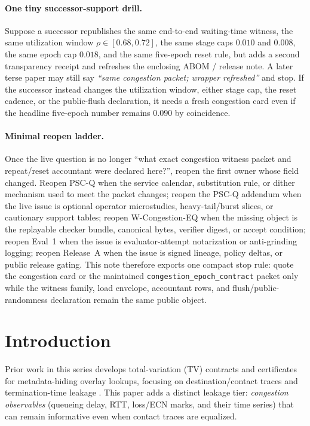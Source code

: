 \documentclass[11pt]{article}
\theoremstyle{definition}
\theoremstyle{remark}
\begin{document}
\paragraph{One tiny successor-support drill.}
Suppose a successor republishes the same end-to-end waiting-time witness, the same utilization window $\rho\in[0.68,0.72]$, the same stage caps $0.010$ and $0.008$, the same epoch cap $0.018$, and the same five-epoch reset rule, but adds a second transparency receipt and refreshes the enclosing ABOM / release note. A later terse paper may still say \emph{``same congestion packet; wrapper refreshed''} and stop. If the successor instead changes the utilization window, either stage cap, the reset cadence, or the public-flush declaration, it needs a fresh congestion card even if the headline five-epoch number remains $0.090$ by coincidence.

\paragraph{Minimal reopen ladder.}
Once the live question is no longer ``what exact congestion witness packet and repeat/reset accountant were declared here?'', reopen the first owner whose field changed. Reopen PSC-Q when the service calendar, substitution rule, or dither mechanism used to meet the packet changes; reopen the PSC-Q addendum when the live issue is optional operator microstudies, heavy-tail/burst slices, or cautionary support tables; reopen W-Congestion-EQ when the missing object is the replayable checker bundle, canonical bytes, verifier digest, or accept condition; reopen Eval~1 when the issue is evaluator-attempt notarization or anti-grinding logging; reopen Release~A when the issue is signed lineage, policy deltas, or public release gating. This note therefore exports one compact stop rule: quote the congestion card or the maintained \nolinkurl{congestion\_epoch\_contract} packet only while the witness family, load envelope, accountant rows, and flush/public-randomness declaration remain the same public object.\cite{series:workedexample,series:pscq,series:pscqaddendum,series:wcongeq,series:evalnotary,anondht_release_receipts}

\section{Introduction}
Prior work in this series develops total-variation (TV) contracts and certificates for metadata-hiding overlay lookups, focusing on destination/contact traces and termination-time leakage \cite{series:schedcompiler,series:knapsacktransport}.
This paper adds a distinct leakage tier: \emph{congestion observables} (queueing delay, RTT, loss/ECN marks, and their time series) that can remain informative even when contact traces are equalized.
\end{document}
